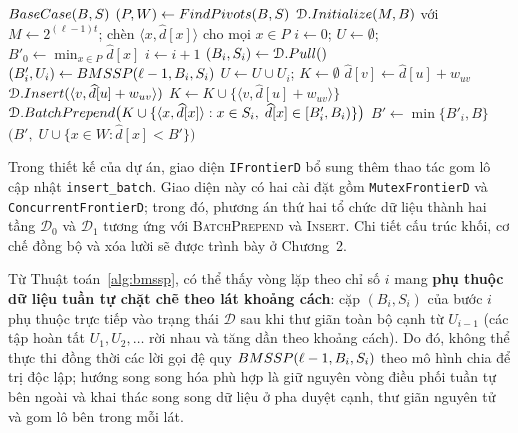 \begin{algorithm}[htbp]
\caption{Thủ tục đệ quy $\textsc{BMSSP}(\ell, B, S)$}
\label{alg:bmssp}
\begin{algorithmic}[1]
        \Return $\textsc{BaseCase}(B, S)$
    \EndIf
    \State $(P, W) \leftarrow \textsc{FindPivots}(B, S)$
    \State $\mathcal{D}.\textsc{Initialize}(M, B)$ với $M \leftarrow 2^{(\ell-1)t}$; \; chèn $\langle x, \widehat{d}[x] \rangle$ cho mọi $x \in P$
    \State $i \leftarrow 0$; \; $U \leftarrow \emptyset$; \; $B'_0 \leftarrow \min_{x \in P} \widehat{d}[x]$ 
        \State $i \leftarrow i + 1$
        \State $(B_i, S_i) \leftarrow \mathcal{D}.\textsc{Pull}()$
        \State $(B'_i, U_i) \leftarrow \textsc{BMSSP}(\ell - 1, B_i, S_i)$
        \State $U \leftarrow U \cup U_i$; \; $K \leftarrow \emptyset$
                \State $\widehat{d}[v] \leftarrow \widehat{d}[u] + w_{uv}$
                \If{$\widehat{d}[u] + w_{uv} \in [B_i, B)$}
                    \State $\mathcal{D}.\textsc{Insert}(\langle v, \widehat{d}[u] + w_{uv} \rangle)$
                \ElsIf{$\widehat{d}[u] + w_{uv} \in [B'_i, B_i)$}
                    \State $K \leftarrow K \cup \{\langle v, \widehat{d}[u] + w_{uv} \rangle\}$
                \EndIf
            \EndIf
        \EndFor
        \State $\mathcal{D}.\textsc{BatchPrepend}\bigl(K \cup \{\langle x, \widehat{d}[x] \rangle : x \in S_i,\; \widehat{d}[x] \in [B'_i, B_i)\}\bigr)$
    \EndWhile
    \State $B' \leftarrow \min\{B'_i, B\}$
    \State \Return $\bigl(B',\; U \cup \{x \in W : \widehat{d}[x] < B'\}\bigr)$
\EndFunction
\end{algorithmic}
\end{algorithm}

Trong thiết kế của dự án, giao diện \texttt{IFrontierD} bổ sung thêm thao tác gom lô cập nhật \texttt{insert\_batch}. Giao diện này có hai cài đặt gồm \texttt{MutexFrontierD} và \texttt{ConcurrentFrontierD}; trong đó, phương án thứ hai tổ chức dữ liệu thành hai tầng $\mathcal{D}_0$ và $\mathcal{D}_1$ tương ứng với \textsc{BatchPrepend} và \textsc{Insert}. Chi tiết cấu trúc khối, cơ chế đồng bộ và xóa lười sẽ được trình bày ở Chương~2.

Từ Thuật toán~\ref{alg:bmssp}, có thể thấy vòng lặp theo chỉ số $i$ mang \textbf{phụ thuộc dữ liệu tuần tự chặt chẽ theo lát khoảng cách}: cặp $(B_i, S_i)$ của bước $i$ phụ thuộc trực tiếp vào trạng thái $\mathcal{D}$ sau khi thư giãn toàn bộ cạnh từ $U_{i-1}$ (các tập hoàn tất $U_1, U_2, \dots$ rời nhau và tăng dần theo khoảng cách). Do đó, không thể thực thi đồng thời các lời gọi đệ quy $\textsc{BMSSP}(\ell - 1, B_i, S_i)$ theo mô hình chia để trị độc lập; hướng song song hóa phù hợp là giữ nguyên vòng điều phối tuần tự bên ngoài và khai thác song song dữ liệu ở pha duyệt cạnh, thư giãn nguyên tử và gom lô bên trong mỗi lát.

